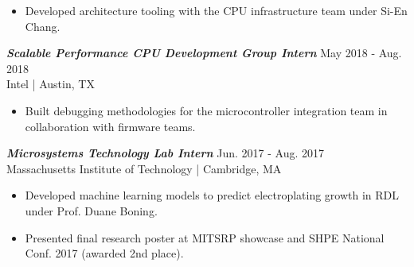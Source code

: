 \documentclass[letter]{res}
\begin{document}
\begin{resume}
 \begin{itemize}
 \item Developed architecture tooling with the CPU infrastructure team under Si-En Chang.
 \end{itemize}

\vspace{-2mm}

{\sl \textbf{Scalable Performance CPU Development Group Intern}} \hfill May 2018 - Aug. 2018\\
Intel | Austin, TX \newline

 \vspace{-4mm}

 \begin{itemize}
 \item Built debugging methodologies for the microcontroller integration
   team in collaboration with firmware teams.
 \end{itemize}

\vspace{-2mm}

{\sl \textbf{Microsystems Technology Lab Intern}} \hfill Jun. 2017 - Aug. 2017\\
Massachusetts Institute of Technology | Cambridge, MA \newline

 \vspace{-4mm}

 \begin{itemize}
 \item Developed machine learning models to predict electroplating growth in RDL under Prof. Duane Boning.
 \item Presented final research poster at MITSRP showcase and SHPE National Conf. 2017 (awarded 2nd place).
 \end{itemize}

\vspace{-2mm}

%
%
%


\end{resume}
\end{document}
